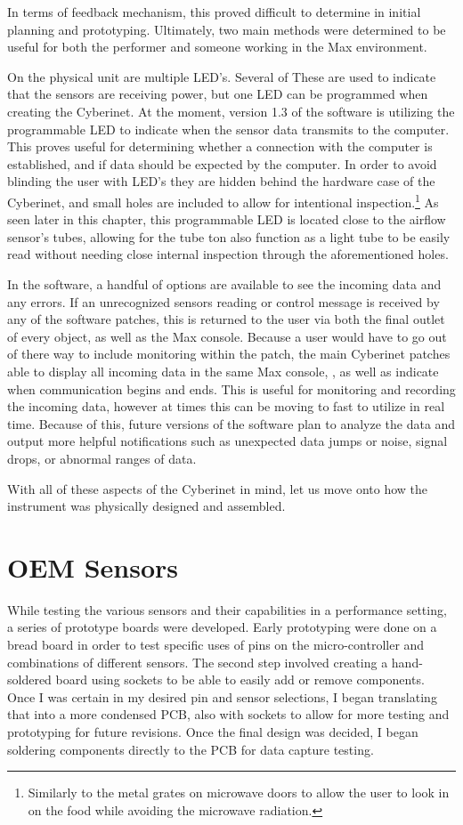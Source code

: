 In terms of feedback mechanism, this proved difficult to determine in initial planning and prototyping. Ultimately, two main methods were determined to be useful for both the performer and someone working in the Max environment.

On the physical unit are multiple LED's. Several of These are used to indicate that the sensors are receiving power, but one LED can be programmed when creating the Cyberinet. At the moment, version 1.3 of the software is utilizing the programmable LED to indicate when the sensor data transmits to the computer. This proves useful for determining whether a connection with the computer is established, and if data should be expected by the computer. In order to avoid blinding the user with LED's they are hidden behind the hardware case of the Cyberinet, and small holes are included to allow for intentional inspection.\footnote{Similarly to the metal grates on microwave doors to allow the user to look in on the food while avoiding the microwave radiation.} As seen later in this chapter, this programmable LED is located close to the airflow sensor's tubes, allowing for the tube ton also function as a light tube to be easily read without needing close internal inspection through the aforementioned holes.

In the software, a handful of options are available to see the incoming data and any errors. If an unrecognized sensors reading or control message is received by any of the software patches, this is returned to the user via both the final outlet of every object, as well as the Max console. Because a user would have to go out of there way to include monitoring within the patch, the main Cyberinet patches able to display all incoming data in the same Max console, , as well as indicate when communication begins and ends. This is useful for monitoring and recording the incoming data, however at times this can be moving to fast to utilize in real time. Because of this, future versions of the software plan to analyze the data and output more helpful notifications such as unexpected data jumps or noise, signal drops, or abnormal ranges of data.

With all of these aspects of the Cyberinet in mind, let us move onto how the instrument was physically designed and assembled.


\section{OEM Sensors}
While testing the various sensors and their capabilities in a performance setting, a series of prototype boards were developed. Early prototyping were done on a bread board in order to test specific uses of pins on the micro-controller and combinations of different sensors. The second step involved creating a hand-soldered board using sockets to be able to easily add or remove components. Once I was certain in my desired pin and sensor selections, I began translating that into a more condensed PCB, also with sockets to allow for more testing and prototyping for future revisions. Once the final design was decided, I began soldering components directly to the PCB for data capture testing.

